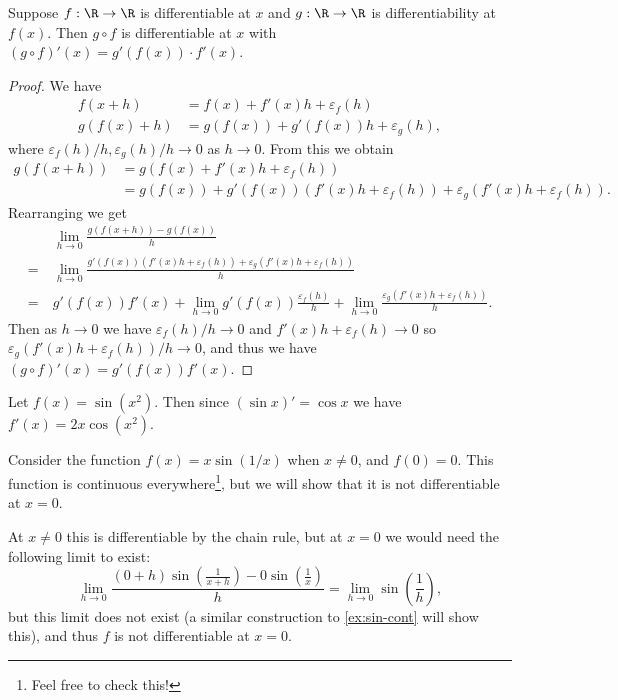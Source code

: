 \documentclass[a4paper]{scrartcl}
\begin{document}
\begin{proposition}
	Suppose $f: \R \rightarrow \R$ is differentiable at $x$ and $g: \R \rightarrow \R$ is differentiability at $f(x)$. Then $g \circ f$ is differentiable at $x$ with $(g \circ f)'(x) = g'(f(x)) \cdot f'(x)$.
\end{proposition}
\begin{proof}
	We have
	\begin{align*}
	f(x + h) &= f(x) + f'(x)h + \varepsilon_f(h) \\
		g(f(x) + h) &= g(f(x)) + g'(f(x)) h + \varepsilon_g(h),
	\end{align*}
	where $\varepsilon_f(h)/h, \varepsilon_g(h)/h \rightarrow 0$ as $h \rightarrow 0$. From this we obtain
	\begin{align*}
		g(f(x + h)) &= g(f(x) + f'(x)h + \varepsilon_f(h)) \\
		&= g(f(x)) + g'(f(x))(f'(x)h + \varepsilon_f(h)) + \varepsilon_g(f'(x)h + \varepsilon_f(h)).
	\end{align*}
	Rearranging we get
	\begin{align*}
		&\lim_{h \to 0}\frac{g(f(x + h)) - g(f(x))}{h}\\
		=\ &\lim_{h \to 0} \frac{g'(f(x))(f'(x)h + \varepsilon_f(h)) + \varepsilon_g(f'(x)h + \varepsilon_f(h))}{h} \\
		=\ &g'(f(x))f'(x) +  \lim_{h \to 0}g'(f(x)) \frac{\varepsilon_f(h)}{h} +\lim_{h \to 0}\frac{\varepsilon_g(f'(x)h + \varepsilon_f(h))}{h}.
	\end{align*}
	Then as $h \rightarrow 0$ we have $\varepsilon_f (h)/h \rightarrow 0$ and $f'(x)h + \varepsilon_f(h) \rightarrow 0$ so $\varepsilon_g(f'(x)h + \varepsilon_f(h))/h \rightarrow 0$, and thus we have
	$
	(g \circ f)'(x) = g'(f(x))f'(x).
	$
\end{proof}



\begin{example}
	Let $f(x) = \sin(x^2)$. Then since $(\sin x)' = \cos x$ we have $f'(x) = 2x \cos (x^2)$.
\end{example}
\begin{example}
	Consider the function $f(x) = x \sin(1/x)$ when $x \neq 0$, and $f(0) = 0$. This function is continuous everywhere\footnote{Feel free to check this!}, but we will show that it is not differentiable at $x = 0$.

	At $x \neq 0$ this is differentiable by the chain rule, but at $x = 0$ we would need the following limit to exist:
	$$
	\lim_{h \to 0} \frac{(0 + h)\sin\left(\frac{1}{x + h}\right) - 0\sin\left(\frac{1}{x}\right)}{h} = \lim_{h \to 0} \sin\left(\frac{1}{h}\right),
	$$
	but this limit does not exist (a similar construction to \autoref{ex:sin-cont} will show this), and thus $f$ is not differentiable at $x = 0$.
\end{example}
\end{document}
